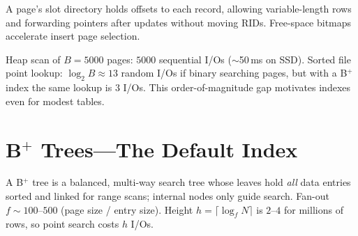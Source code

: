 \begin{remark}
A page's slot directory holds offsets to each record, allowing variable-length rows and forwarding pointers after updates without moving RIDs. Free-space bitmaps accelerate insert page selection.
\end{remark}

\begin{example}
Heap scan of $B=5000$ pages: $5000$ sequential I/Os ($\sim$50\,ms on SSD). Sorted file point lookup: $\log_2 B\approx 13$ random I/Os if binary searching pages, but with a B$^+$ index the same lookup is $3$ I/Os. This order-of-magnitude gap motivates indexes even for modest tables.
\end{example}

\section{B\texorpdfstring{$^{+}$}{+} Trees---The Default Index}
\label{sec:bplus}

A B$^+$ tree is a balanced, multi-way search tree whose leaves hold \emph{all} data entries sorted and linked for range scans; internal nodes only guide search. Fan-out $f\sim 100$--$500$ (page size / entry size). Height $h=\lceil\log_f N\rceil$ is $2$--$4$ for millions of rows, so point search costs $h$ I/Os.

